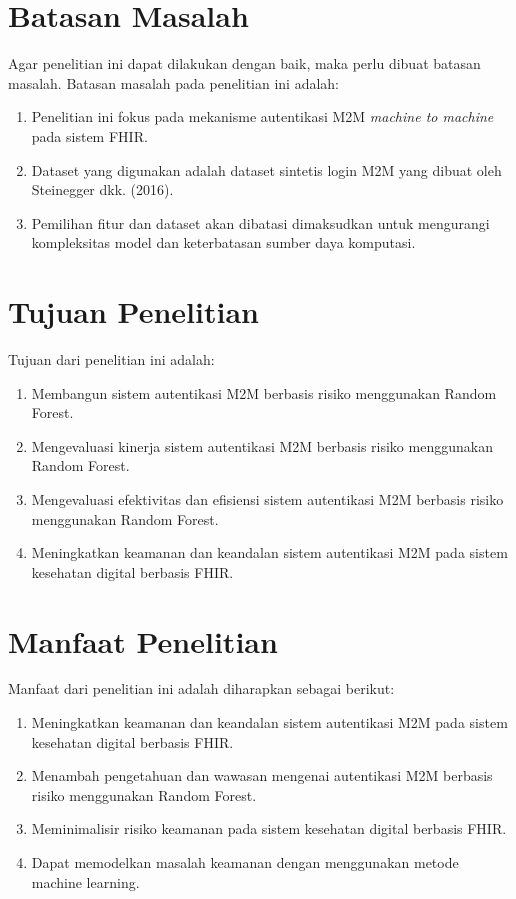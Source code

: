 \section{Batasan Masalah}
Agar penelitian ini dapat dilakukan dengan baik, maka perlu dibuat batasan masalah.
Batasan masalah pada penelitian ini adalah:
\begin{enumerate}
	\item Penelitian ini fokus pada mekanisme autentikasi M2M \textit{machine to machine} pada sistem FHIR.
	\item Dataset yang digunakan adalah dataset sintetis login M2M yang dibuat oleh Steinegger dkk. (2016).
	\item Pemilihan fitur dan dataset akan dibatasi dimaksudkan untuk mengurangi kompleksitas model dan keterbatasan sumber daya komputasi.
\end{enumerate}

\section{Tujuan Penelitian}
Tujuan dari penelitian ini adalah:
\begin{enumerate}
	\item Membangun sistem autentikasi M2M berbasis risiko menggunakan Random Forest.
	\item Mengevaluasi kinerja sistem autentikasi M2M berbasis risiko menggunakan Random Forest.
	\item Mengevaluasi efektivitas dan efisiensi sistem autentikasi M2M berbasis risiko menggunakan Random Forest.
	\item Meningkatkan keamanan dan keandalan sistem autentikasi M2M pada sistem kesehatan digital berbasis FHIR.
\end{enumerate}


\section{Manfaat Penelitian}
Manfaat dari penelitian ini adalah diharapkan sebagai berikut:
\begin{enumerate}
	\item Meningkatkan keamanan dan keandalan sistem autentikasi M2M pada sistem kesehatan digital berbasis FHIR.
	\item Menambah pengetahuan dan wawasan mengenai autentikasi M2M berbasis risiko menggunakan Random Forest.
	\item Meminimalisir risiko keamanan pada sistem kesehatan digital berbasis FHIR.
	\item Dapat memodelkan masalah keamanan dengan menggunakan metode machine learning.
\end{enumerate}
